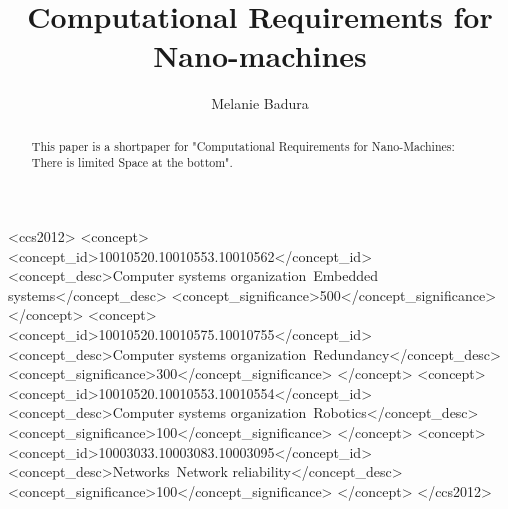 \documentclass[10pt,sigconf]{acmart}
\begin{document}
\title{Computational Requirements for Nano-machines}

\author{Melanie Badura}




\renewcommand{\shortauthors}{F. Lastname et al.}


\begin{abstract}
This paper is a shortpaper for "Computational Requirements for 
Nano-Machines: There is limited Space at the bottom".\cite{lau2017computational}{}
\end{abstract}

%
%
\begin{CCSXML}
<ccs2012>
 <concept>
  <concept_id>10010520.10010553.10010562</concept_id>
  <concept_desc>Computer systems organization~Embedded systems</concept_desc>
  <concept_significance>500</concept_significance>
 </concept>
 <concept>
  <concept_id>10010520.10010575.10010755</concept_id>
  <concept_desc>Computer systems organization~Redundancy</concept_desc>
  <concept_significance>300</concept_significance>
 </concept>
 <concept>
  <concept_id>10010520.10010553.10010554</concept_id>
  <concept_desc>Computer systems organization~Robotics</concept_desc>
  <concept_significance>100</concept_significance>
 </concept>
 <concept>
  <concept_id>10003033.10003083.10003095</concept_id>
  <concept_desc>Networks~Network reliability</concept_desc>
  <concept_significance>100</concept_significance>
 </concept>
</ccs2012>  
\end{CCSXML}






\maketitle
\end{document}
